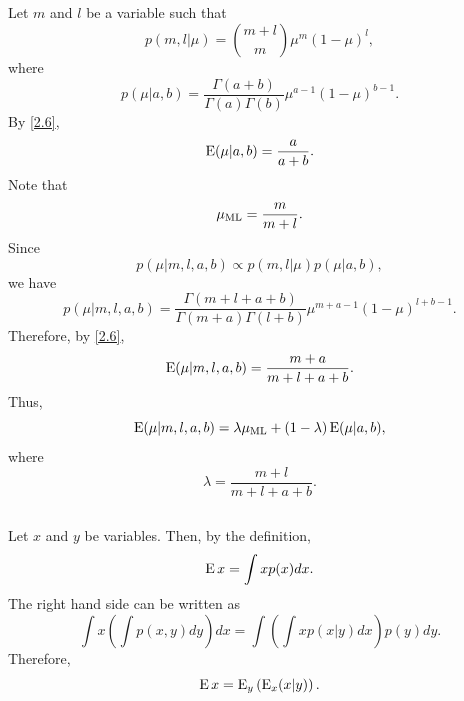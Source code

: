 \subsection{}
\label{2.7}
Let $m$ and $l$ be a variable such that
%
\begin{equation}
p(m, l | \mu) 
= 
{m + l \choose m} 
\mu ^ m 
(1 - \mu) ^ l,
\end{equation}
%
where
%
\begin{equation}
p(\mu | a, b) 
= 
\frac{\Gamma(a + b)}{\Gamma(a) \Gamma(b)} 
\mu ^ {a - 1} 
(1 - \mu) ^ {b - 1}.
\end{equation}
%
By \ref{2.6}, 
%
\begin{equation}
\operatorname{E} (\mu | a, b) 
= 
\frac{a}{a + b}.
\end{equation}
%
Note that
%
\begin{equation}
\mu_{\rm ML} 
= 
\frac{m}{m + l}.
\end{equation}
%
Since
%
\begin{equation}
p(\mu | m, l, a,  b) 
\propto 
p(m, l | \mu) p(\mu | a, b),
\end{equation}
%
we have
%
\begin{equation}
p(\mu | m, l, a,  b) 
= 
\frac{\Gamma(m + l + a + b)}{\Gamma (m + a) \Gamma (l + b)} 
\mu ^ {m + a - 1} 
(1 - \mu) ^ {l + b - 1}.
\end{equation}
%
Therefore, by \ref{2.6}, 
%
\begin{equation}
\operatorname{E} (\mu | m, l, a, b) 
= 
\frac{m + a}{m + l + a + b}.
\end{equation}
%
Thus,
%
\begin{equation}
\operatorname{E} (\mu | m, l, a, b) 
= 
\lambda 
\mu_{\rm ML}
+ 
(1 - \lambda) 
\operatorname{E} (\mu | a, b),
\end{equation}
%
where
%
\begin{equation}
\lambda 
= 
\frac{m + l}{m + l + a + b}.
\end{equation}
%


\subsection{}
\label{2.8}
Let $x$ and $y$ be variables.
Then, by the definition,
%
\begin{equation}
\operatorname{E} x 
= 
\int 
x 
p(x) 
dx.
\end{equation}
%
The right hand side can be written as
%
\begin{equation}
\int 
x 
\left( 
	\int 
	p(x, y) 
	dy 
\right) 
dx 
= 
\int 
\left( 
	\int 
	x 
	p(x | y) 
	dx 
\right) 
p(y) 
dy.
\end{equation}
%
Therefore,
%
\begin{equation}
\operatorname{E} x 
= 
\operatorname{E}_y 
\left( 
	\operatorname{E}_x (x | y)
\right).
\end{equation}
%

